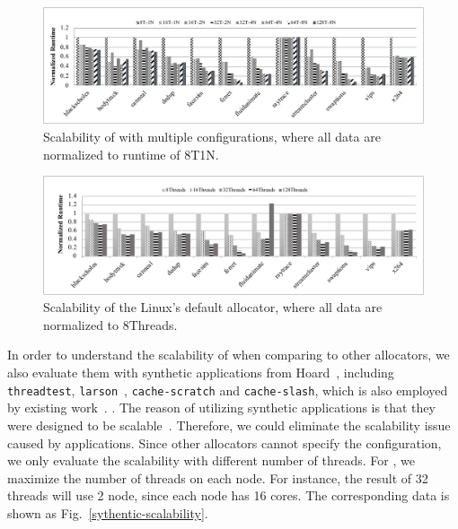 \begin{figure}[!h]
    \centering
    \includegraphics[width=\textwidth]{figure/scalobility-numalloc.pdf}
    \caption{Scalability of \NM{} with multiple configurations, where all data are normalized to runtime of 8T1N.\label{fig: numalloc-scalability}}
\end{figure}

\begin{figure}[!h]
    \centering
    \includegraphics[width=\textwidth]{figure/scalability-pthread.pdf}
    \caption{Scalability of the Linux's default allocator, where all data are normalized to 8Threads.}
    \label{pthread-scalibity}
\end{figure}

 In order to understand the scalability of \NM{} when comparing to other allocators, we also evaluate them with synthetic applications from Hoard~\cite{Hoard}, including \texttt{threadtest}, \texttt{larson}~\cite{Larson}, \texttt{cache-scratch} and \texttt{cache-slash}, which is also employed by existing work~\cite{Scalloc}. . The reason of utilizing synthetic applications is that they were designed to be scalable~\cite{Scalloc}. Therefore, we could eliminate the scalability issue caused by applications. Since other allocators cannot specify the configuration, we only evaluate the scalability with different number of threads. For \NM{}, we maximize the number of threads on each node. For instance, the result of 32 threads will use 2 node, since each node has 16 cores. The corresponding data is shown as Fig.~\ref{sythentic-scalability}. 
 
